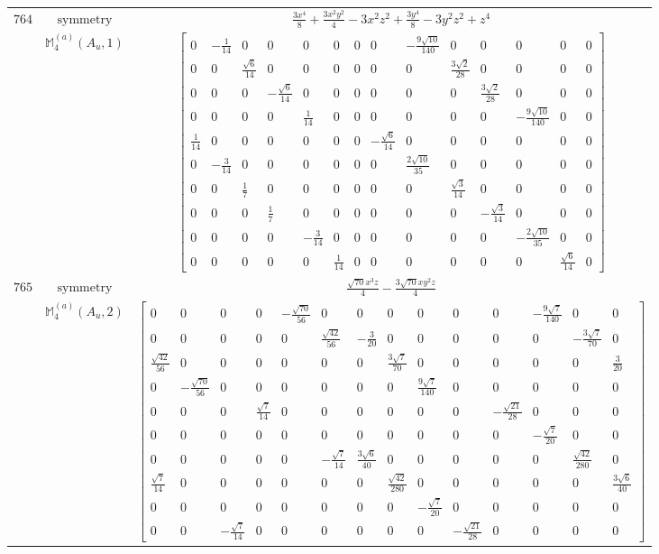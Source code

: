\documentclass[fleqn,8pt,landscape]{jsarticle}
\begin{document}
\begin{longtable}{ccc}
$ 764 $ & $ \text{symmetry} $ & $ \frac{3 x^{4}}{8} + \frac{3 x^{2} y^{2}}{4} - 3 x^{2} z^{2} + \frac{3 y^{4}}{8} - 3 y^{2} z^{2} + z^{4} $ \\
$  $ & $ \mathbb{M}_{4}^{(a)}(A_{u},1) $ & $ \begin{bmatrix} 0 & - \frac{1}{14} & 0 & 0 & 0 & 0 & 0 & 0 & - \frac{9 \sqrt{10}}{140} & 0 & 0 & 0 & 0 & 0 \\ 0 & 0 & \frac{\sqrt{6}}{14} & 0 & 0 & 0 & 0 & 0 & 0 & \frac{3 \sqrt{2}}{28} & 0 & 0 & 0 & 0 \\ 0 & 0 & 0 & - \frac{\sqrt{6}}{14} & 0 & 0 & 0 & 0 & 0 & 0 & \frac{3 \sqrt{2}}{28} & 0 & 0 & 0 \\ 0 & 0 & 0 & 0 & \frac{1}{14} & 0 & 0 & 0 & 0 & 0 & 0 & - \frac{9 \sqrt{10}}{140} & 0 & 0 \\ \frac{1}{14} & 0 & 0 & 0 & 0 & 0 & 0 & - \frac{\sqrt{6}}{14} & 0 & 0 & 0 & 0 & 0 & 0 \\ 0 & - \frac{3}{14} & 0 & 0 & 0 & 0 & 0 & 0 & \frac{2 \sqrt{10}}{35} & 0 & 0 & 0 & 0 & 0 \\ 0 & 0 & \frac{1}{7} & 0 & 0 & 0 & 0 & 0 & 0 & \frac{\sqrt{3}}{14} & 0 & 0 & 0 & 0 \\ 0 & 0 & 0 & \frac{1}{7} & 0 & 0 & 0 & 0 & 0 & 0 & - \frac{\sqrt{3}}{14} & 0 & 0 & 0 \\ 0 & 0 & 0 & 0 & - \frac{3}{14} & 0 & 0 & 0 & 0 & 0 & 0 & - \frac{2 \sqrt{10}}{35} & 0 & 0 \\ 0 & 0 & 0 & 0 & 0 & \frac{1}{14} & 0 & 0 & 0 & 0 & 0 & 0 & \frac{\sqrt{6}}{14} & 0 \end{bmatrix} $ \\ \hline
$ 765 $ & $ \text{symmetry} $ & $ \frac{\sqrt{70} x^{3} z}{4} - \frac{3 \sqrt{70} x y^{2} z}{4} $ \\
$  $ & $ \mathbb{M}_{4}^{(a)}(A_{u},2) $ & $ \begin{bmatrix} 0 & 0 & 0 & 0 & - \frac{\sqrt{70}}{56} & 0 & 0 & 0 & 0 & 0 & 0 & - \frac{9 \sqrt{7}}{140} & 0 & 0 \\ 0 & 0 & 0 & 0 & 0 & \frac{\sqrt{42}}{56} & - \frac{3}{20} & 0 & 0 & 0 & 0 & 0 & - \frac{3 \sqrt{7}}{70} & 0 \\ \frac{\sqrt{42}}{56} & 0 & 0 & 0 & 0 & 0 & 0 & \frac{3 \sqrt{7}}{70} & 0 & 0 & 0 & 0 & 0 & \frac{3}{20} \\ 0 & - \frac{\sqrt{70}}{56} & 0 & 0 & 0 & 0 & 0 & 0 & \frac{9 \sqrt{7}}{140} & 0 & 0 & 0 & 0 & 0 \\ 0 & 0 & 0 & \frac{\sqrt{7}}{14} & 0 & 0 & 0 & 0 & 0 & 0 & - \frac{\sqrt{21}}{28} & 0 & 0 & 0 \\ 0 & 0 & 0 & 0 & 0 & 0 & 0 & 0 & 0 & 0 & 0 & - \frac{\sqrt{7}}{20} & 0 & 0 \\ 0 & 0 & 0 & 0 & 0 & - \frac{\sqrt{7}}{14} & \frac{3 \sqrt{6}}{40} & 0 & 0 & 0 & 0 & 0 & \frac{\sqrt{42}}{280} & 0 \\ \frac{\sqrt{7}}{14} & 0 & 0 & 0 & 0 & 0 & 0 & \frac{\sqrt{42}}{280} & 0 & 0 & 0 & 0 & 0 & \frac{3 \sqrt{6}}{40} \\ 0 & 0 & 0 & 0 & 0 & 0 & 0 & 0 & - \frac{\sqrt{7}}{20} & 0 & 0 & 0 & 0 & 0 \\ 0 & 0 & - \frac{\sqrt{7}}{14} & 0 & 0 & 0 & 0 & 0 & 0 & - \frac{\sqrt{21}}{28} & 0 & 0 & 0 & 0 \end{bmatrix} $ \\ \hline

\end{longtable}
\end{document}
